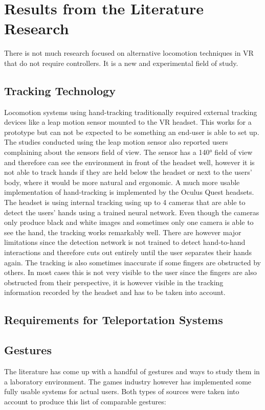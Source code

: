 \chapter{Results from the Literature Research}

There is not much research focused on alternative locomotion techniques in VR that do not require controllers. It is a new and experimental field of study.

\section{Tracking Technology}
Locomotion systems using hand-tracking traditionally required external tracking devices like a leap motion sensor mounted to the VR headset. %
This works for a prototype but can not be expected to be something an end-user is able to set up. The studies conducted using the leap motion sensor also reported users complaining about the sensors field of view. %
The sensor has a 140° field of view and therefore can see the environment in front of the headset well, however it is not able to track hands if they are held below the headset or next to the users' body, where it would be more natural and ergonomic. A much more usable implementation of hand-tracking is implemented by the Oculus Quest headsets. %
The headset is using internal tracking using up to 4 cameras that are able to detect the users' hands using a trained neural network. %
Even though the cameras only produce black and white images and sometimes only one camera is able to see the hand, the tracking works remarkably well. There are however major limitations since the detection network is not trained to detect hand-to-hand interactions and therefore cuts out entirely until the user separates their hands again. The tracking is also sometimes inaccurate if some fingers are obstructed by others. In most cases this is not very visible to the user since the fingers are also obstructed from their perspective, it is however visible in the tracking information recorded by the headset and has to be taken into account. 

\section{Requirements for Teleportation Systems}



\section{Gestures}
The literature has come up with a handful of gestures and ways to study them in a laboratory environment. The games industry however has implemented some fully usable systems for actual users. Both types of sources were taken into account to produce this list of comparable gestures:

